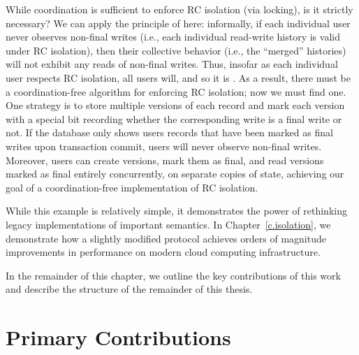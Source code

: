 While coordination is sufficient to enforce RC isolation (via
locking), is it strictly necessary? We can apply the principle of
\iconfluence here: informally, if each individual user never observes
non-final writes (i.e., each individual read-write history is valid
under RC isolation), then their collective behavior (i.e., the
``merged'' histories) will not exhibit any reads of non-final
writes. Thus, insofar as each individual user respects RC isolation,
all users will, and so it is \iconfluent. As a result, there must be a
coordination-free algorithm for enforcing RC isolation; now we must
find one. One strategy is to store multiple versions of each record
and mark each version with a special bit recording whether the
corresponding write is a final write or not. If the database only
shows users records that have been marked as final writes upon
transaction commit, users will never observe non-final
writes. Moreover, users can create versions, mark them as final, and
read versions marked as final entirely concurrently, on separate
copies of state, achieving our goal of a coordination-free
implementation of RC isolation.

While this example is relatively simple, it demonstrates the power of
rethinking legacy implementations of important semantics. In
Chapter~\ref{c.isolation}, we demonstrate how a slightly modified
protocol achieves orders of magnitude improvements in performance on
modern cloud computing infrastructure.\vspace{.5em}

In the remainder of this chapter, we outline the key contributions of
this work and describe the structure of the remainder of this thesis.

\section{Primary Contributions}

